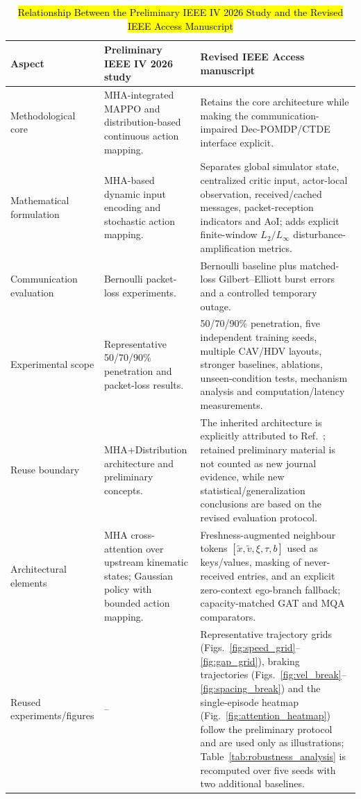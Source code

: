 \documentclass{ieeeaccess}
\begin{document}
\begin{table}[htbp]
\centering
\caption{\hl{Relationship Between the Preliminary IEEE IV 2026 Study and the Revised IEEE Access Manuscript}}
\label{tab:iv_access_novelty}
\renewcommand{\arraystretch}{1.15}
\begin{tabularx}{\textwidth}{|p{3.1cm}|X|X|}
\hline
\rowcolor{yellow}\textbf{Aspect} & \textbf{Preliminary IEEE IV 2026 study} & \textbf{Revised IEEE Access manuscript} \\ \hline
\rowcolor{yellow}Methodological core & MHA-integrated MAPPO and distribution-based continuous action mapping. & Retains the core architecture while making the communication-impaired Dec-POMDP/CTDE interface explicit. \\ \hline
\rowcolor{yellow}Mathematical formulation & MHA-based dynamic input encoding and stochastic action mapping. & Separates global simulator state, centralized critic input, actor-local observation, received/cached messages, packet-reception indicators and AoI; adds explicit finite-window $L_2/L_\infty$ disturbance-amplification metrics. \\ \hline
\rowcolor{yellow}Communication evaluation & Bernoulli packet-loss experiments. & Bernoulli baseline plus matched-loss Gilbert--Elliott burst errors and a controlled temporary outage. \\ \hline
\rowcolor{yellow}Experimental scope & Representative 50/70/90\% penetration and packet-loss results. & 50/70/90\% penetration, five independent training seeds, multiple CAV/HDV layouts, stronger baselines, ablations, unseen-condition tests, mechanism analysis and computation/latency measurements. \\ \hline
\rowcolor{yellow}Reuse boundary & MHA+Distribution architecture and preliminary concepts. & The inherited architecture is explicitly attributed to Ref.~\cite{cai2026integrating}; retained preliminary material is not counted as new journal evidence, while new statistical/generalization conclusions are based on the revised evaluation protocol. \\ \hline
\rowcolor{yellow}Architectural elements & MHA cross-attention over upstream kinematic states; Gaussian policy with bounded action mapping. & Freshness-augmented neighbour tokens $[\tilde x,\tilde v,\xi,\tau,b]$ used as keys/values, masking of never-received entries, and an explicit zero-context ego-branch fallback; capacity-matched GAT and MQA comparators. \\ \hline
\rowcolor{yellow}Reused experiments/figures & -- & Representative trajectory grids (Figs.~\ref{fig:speed_grid}--\ref{fig:gap_grid}), braking trajectories (Figs.~\ref{fig:vel_break}--\ref{fig:spacing_break}) and the single-episode heatmap (Fig.~\ref{fig:attention_heatmap}) follow the preliminary protocol and are used only as illustrations; Table~\ref{tab:robustness_analysis} is recomputed over five seeds with two additional baselines. \\ \hline %

\end{tabularx}
\end{table}
\end{document}

